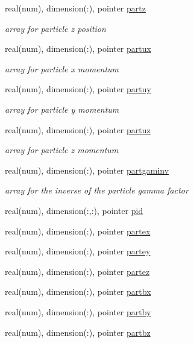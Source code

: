 \begin{DoxyCompactItemize}
real(num), dimension(\+:), pointer \hyperlink{namespacepython__pointers_a318b3d65ffe6c40b81bae433e093df16}{partz}
\begin{DoxyCompactList}\small\item\em array for particle z position \end{DoxyCompactList}\item 
real(num), dimension(\+:), pointer \hyperlink{namespacepython__pointers_a733cff77ba19e5a06a73224fe9f53542}{partux}
\begin{DoxyCompactList}\small\item\em array for particle x momentum \end{DoxyCompactList}\item 
real(num), dimension(\+:), pointer \hyperlink{namespacepython__pointers_a60b173a25b047377d55cd66dfb5fad04}{partuy}
\begin{DoxyCompactList}\small\item\em array for particle y momentum \end{DoxyCompactList}\item 
real(num), dimension(\+:), pointer \hyperlink{namespacepython__pointers_a98c8cf1649933f3239b068104d637d6c}{partuz}
\begin{DoxyCompactList}\small\item\em array for particle z momentum \end{DoxyCompactList}\item 
real(num), dimension(\+:), pointer \hyperlink{namespacepython__pointers_a072266fc5f086ac68bdb72332b296a07}{partgaminv}
\begin{DoxyCompactList}\small\item\em array for the inverse of the particle gamma factor \end{DoxyCompactList}\item 
real(num), dimension(\+:,\+:), pointer \hyperlink{namespacepython__pointers_a8a754456a1a3440c897f9a6249782713}{pid}
\item 
real(num), dimension(\+:), pointer \hyperlink{namespacepython__pointers_ad4fc57017cff184e92ae60ff0006c62c}{partex}
\item 
real(num), dimension(\+:), pointer \hyperlink{namespacepython__pointers_af358e4be4f10aeff30df94181589c382}{partey}
\item 
real(num), dimension(\+:), pointer \hyperlink{namespacepython__pointers_a61f858897e873f37d7bb3e355e2b9740}{partez}
\item 
real(num), dimension(\+:), pointer \hyperlink{namespacepython__pointers_a9de58f9a1f88381cac4457014ee8859f}{partbx}
\item 
real(num), dimension(\+:), pointer \hyperlink{namespacepython__pointers_aab1fc483934951de61c30198fa476e40}{partby}
\item 
real(num), dimension(\+:), pointer \hyperlink{namespacepython__pointers_a9c50a4b64ff01114243eebc0dc729ae8}{partbz}
\end{DoxyCompactItemize}


